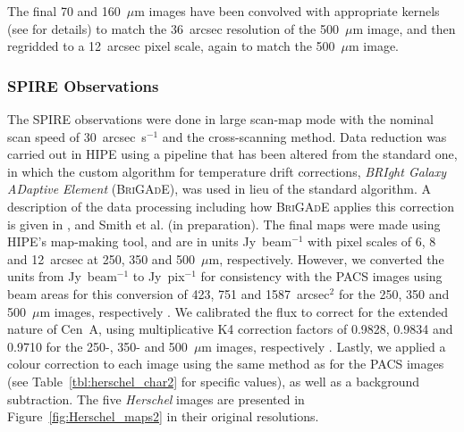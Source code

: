 The final 70 and 160~$\mu$m images have been convolved with appropriate kernels (see \citet{Bendo_2011_submit} for details) to match the 36~arcsec resolution of the 500~$\mu$m image, and then regridded to a 12~arcsec pixel scale, again to match the 500~$\mu$m image.

\subsubsection{SPIRE Observations}\label{subsubsec:SPIRE}
The SPIRE observations were done in large scan-map mode with the nominal scan speed of 30~arcsec~s$^{-1}$ and the cross-scanning method.  Data reduction was carried out in HIPE using a pipeline that has been altered from the standard one, in which the custom algorithm for temperature drift corrections, \emph{BRIght Galaxy ADaptive Element} (\textsc{BriGAdE}), was used in lieu of the standard algorithm.  A description of the data processing including how \textsc{BriGAdE} applies this correction is given in \citet{Auld_2011_submit}, \citet{Smith_2012_in_press} and Smith et al. (in preparation).  The final maps were made using HIPE's map-making tool, and are in units Jy~beam$^{-1}$ with pixel scales of 6, 8 and 12~arcsec at 250, 350 and 500~$\mu$m, respectively.  However, we converted the units from Jy~beam$^{-1}$ to Jy~pix$^{-1}$ for consistency with the PACS images using beam areas for this conversion of 423, 751 and 1587~arcsec$^{2}$ for the 250, 350 and 500~$\mu$m images, respectively \citep{SOM_2010}.  We calibrated the flux to correct for the extended nature of Cen~A, using multiplicative K4 correction factors of 0.9828, 0.9834 and 0.9710 for the 250-, 350- and 500~$\mu$m images, respectively \citep{SOM_2010}.  Lastly, we applied a colour correction to each image using the same method as for the PACS images (see Table~\ref{tbl:herschel_char2} for specific values), as well as a background subtraction. The five \emph{Herschel} images are presented in Figure~\ref{fig:Herschel_maps2} in their original resolutions.

